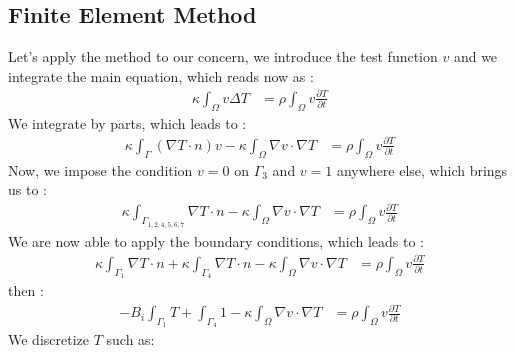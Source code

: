 \subsection{Finite Element Method}
Let's apply the method to our concern, we introduce the test function $v$ and we integrate the main equation, which reads now as :
\begin{equation}
   \begin{split}
      \displaystyle{\kappa \int_\varOmega v\Delta T} & = \displaystyle{\rho \int_\varOmega v\frac{ \partial T}{\partial t}}  
  \end{split}
\end{equation}
We integrate by parts, which leads to :
\begin{equation}
   \begin{split}
      \displaystyle{\kappa \int_\Gamma {(\nabla T \cdot n) v} - \kappa \int_\varOmega {\nabla v \cdot \nabla T} }  & = \displaystyle{\rho \int_\varOmega v\frac{ \partial T}{\partial t}} 
  \end{split}
\end{equation}
Now, we impose the condition $v=0$ on $\Gamma_3$ and $v=1$ anywhere else, which brings us to :
\begin{equation}
   \begin{split}
    \displaystyle{\kappa \int_{\Gamma_{1,2,4,5,6,7}} {\nabla T \cdot n} - \kappa \int_\varOmega {\nabla v \cdot \nabla T} }  & =  
	\displaystyle{\rho \int_\varOmega v\frac{ \partial T}{\partial t}} 
  \end{split}
\end{equation}
We are now able to apply the boundary conditions, which leads to :
\begin{equation}
   \begin{split}
 \displaystyle{\kappa \int_{\Gamma_1}{\nabla T \cdot n} + \kappa \int_{\Gamma_4} {\nabla T \cdot n} - \kappa \int_\varOmega {\nabla v \cdot \nabla T} }
	 & =       \displaystyle{\rho \int_\varOmega v\frac{ \partial T}{\partial t}}
  \end{split}
\end{equation}
then :
\begin{equation}
   \begin{split}
      \displaystyle{- B_i \int_{\Gamma_1}{T} + \int_{\Gamma_4}{1} - \kappa \int_\varOmega {\nabla v \cdot \nabla T} }  & = \displaystyle{\rho \int_\varOmega v\frac{ \partial T}{\partial t}}
  \end{split}
\end{equation}
We discretize $T$ such as:
